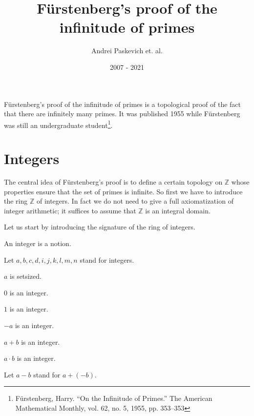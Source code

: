 \documentclass{article}
\title{Fürstenberg's proof of the infinitude of primes}
\author{Andrei Paskevich et. al.}
\date{2007 - 2021}
\newcommand{\Int}{\mathbb{Z}}
\begin{document}
  \maketitle

  Fürstenberg's proof of the infinitude of primes is a topological proof of the fact that there are infinitely many primes. It was published 1955 while Fürstenberg was still an undergraduate student\footnote{Fürstenberg, Harry. “On the Infinitude of Primes.” The American Mathematical Monthly, vol. 62, no. 5, 1955, pp. 353–353}.

  \section{Integers}

  The central idea of Fürstenberg's proof is to define a certain topology on $\Int$ whose properties ensure that the set of primes is infinite. So first we have to introduce the ring $\Int$ of integers. In fact we do not need to give a full axiomatization of integer arithmetic; it suffices to assume that $\Int$ is an integral domain.

  Let us start by introducing the signature of the ring of integers.

  \begin{forthel}

    \begin{signature}[Integers]
      An integer is a notion.
    \end{signature}

    Let $a,b,c,d,i,j,k,l,m,n$ stand for integers.

    \begin{axiom}
      $a$ is setsized.
    \end{axiom}

    \begin{signature}[IntZero]
      $0$ is an integer.
    \end{signature}

    \begin{signature}[IntOne]
      $1$ is an integer.
    \end{signature}

    \begin{signature}[IntNeg]
      $-a$ is an integer.
    \end{signature}

    \begin{signature}[IntPlus]
      $a + b$ is an integer.
    \end{signature}

    \begin{signature}[IntMult]
      $a \cdot b$ is an integer.
    \end{signature}

    Let $a - b$ stand for $a + (-b)$.
  \end{forthel}
\end{document}
